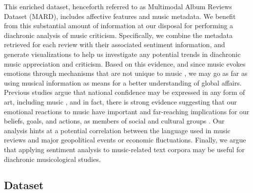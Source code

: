 This enriched dataset, henceforth referred to as Multimodal Album Reviews Dataset (MARD), includes affective features and music metadata. %
We benefit from this substantial amount of information at our disposal for performing a diachronic analysis of music criticism. Specifically, we combine the metadata retrieved for each review with their associated sentiment information, and generate visualizations to help us investigate any potential trends in diachronic music appreciation and criticism. Based on this evidence, and since music evokes emotions through mechanisms that are not unique to music \citep{Juslin2008}, we may go as far as using musical information as means for a better understanding of global affairs. Previous studies argue that national confidence may be expressed in any form of art, including music \citep{Moisi2010}, and in fact, there is strong evidence suggesting that our emotional reactions to music have important and far-reaching implications for our beliefs, goals, and actions, as members of social and cultural groups \citep{Alcorta2008}. Our analysis hints at a potential correlation between the language used in music reviews and major geopolitical events or economic fluctuations. Finally, we argue that applying sentiment analysis to music-related text corpora may be useful for diachronic musicological studies.


\subsection{Dataset}
\label{sec:musicology:mard}

